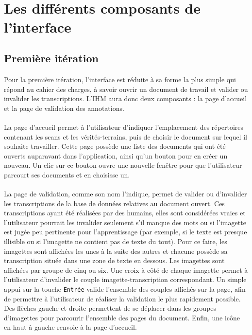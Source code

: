 \section{Les différents composants de l'interface}

\subsection{Première itération}

\paragraph{}
Pour la première itération, l’interface est réduite à sa forme la plus simple qui répond au cahier des charges, à savoir ouvrir un document de travail et valider ou invalider les transcriptions. L’IHM aura donc deux composants : la page d’accueil et la page de validation des annotations.

\paragraph{}
La page d’accueil permet à l’utilisateur d’indiquer l’emplacement des répertoires contenant les scans et les vérités-terrains, puis de choisir le document sur lequel il souhaite travailler. Cette page possède une liste des documents qui ont été ouverts auparavant dans l’application, ainsi qu’un bouton pour en créer un nouveau. Un clic sur ce bouton ouvre une nouvelle fenêtre pour que l’utilisateur parcourt ses documents et en choisisse un.



\paragraph{}
La page de validation, comme son nom l’indique, permet de valider ou d’invalider les transcriptions de la base de données relatives au document ouvert. Ces transcriptions ayant été réalisées par des humains, elles sont considérées vraies et l’utilisateur pourrait les invalider seulement s’il manque des mots ou si l’imagette est jugée peu pertinente pour l’apprentissage (par exemple, si le texte est presque illisible ou si l’imagette ne contient pas de texte du tout). Pour ce faire, les imagettes sont affichées les unes à la suite des autres et chacune possède sa transcription située dans une zone de texte en dessous. Les imagettes sont affichées par groupe de cinq ou six. Une croix à côté de chaque imagette permet à l’utilisateur d’invalider le couple imagette-transcription correspondant. Un simple appui sur la touche \texttt{Entrée} valide l’ensemble des couples affichés sur la page, afin de permettre à l’utilisateur de réaliser la validation le plus rapidement possible. Des flèches gauche et droite permettent de se déplacer dans les groupes d’imagettes pour parcourir l’ensemble des pages du document. Enfin, une icône en haut à gauche renvoie à la page d’accueil.

